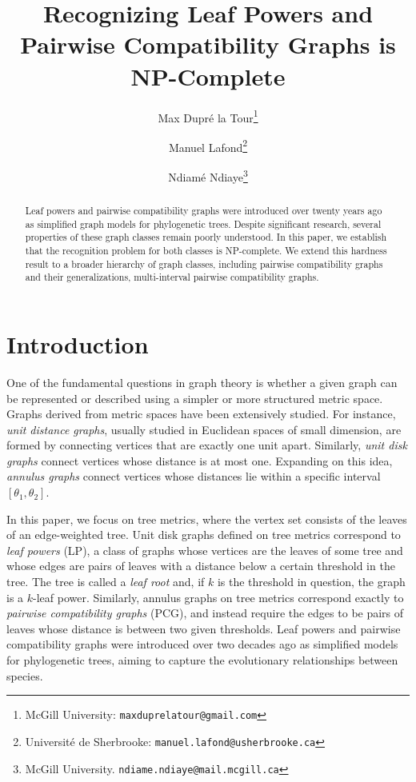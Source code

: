 \documentclass[11pt, letter]{article}
\title{Recognizing Leaf Powers and Pairwise Compatibility Graphs is NP-Complete}
\date{}
\author{Max Dupr\'e la Tour\thanks{McGill University: \texttt{maxduprelatour@gmail.com}} \and 
Manuel Lafond\thanks{Universit\'e de Sherbrooke: \texttt{manuel.lafond@usherbrooke.ca}} \and 
Ndiam\'e Ndiaye\thanks{McGill University. \texttt{ndiame.ndiaye@mail.mcgill.ca}} }
\newcommand{\ml}[1]{{\color{blue}{{#1}}}}
\theoremstyle{remark}
\begin{document}
\maketitle

\begin{abstract}
Leaf powers and pairwise compatibility graphs were introduced over twenty years ago as simplified graph models for phylogenetic trees. Despite significant research, several properties of these graph classes remain poorly understood. In this paper, we establish that the recognition problem for both classes is NP-complete. We extend this hardness result to a broader hierarchy of graph classes, including pairwise compatibility graphs and their generalizations, multi-interval pairwise compatibility graphs. 
\end{abstract}

\section{Introduction}

One of the fundamental questions in graph theory is whether a given graph can be represented or described using a simpler or more structured metric space. Graphs derived from metric spaces have been extensively studied. For instance, \emph{unit distance graphs}, usually studied in Euclidean spaces of small dimension, are formed by connecting vertices that are exactly one unit apart. Similarly, \emph{unit disk graphs} connect vertices whose distance is at most one. Expanding on this idea, \emph{annulus graphs} connect vertices whose distances lie within a specific interval $[\theta_1,\theta_2]$.

In this paper, we focus on tree metrics, where the vertex set consists of the leaves of an edge-weighted tree.
Unit disk graphs defined on tree metrics correspond to \emph{leaf powers} (LP), a class of graphs whose vertices are the leaves of some tree and whose edges are pairs of leaves with a distance below a certain threshold in the tree.
The tree is called a \emph{leaf root} and, if $k$ is the threshold in question, the graph is a $k$-leaf power.
Similarly, annulus graphs on tree metrics correspond exactly to \emph{pairwise compatibility graphs} (PCG), and instead require the edges to be pairs of leaves whose distance is between two given thresholds. Leaf powers and pairwise compatibility graphs were introduced over two decades ago \cite{NISHIMURA200269,Kearney2003} as simplified models for phylogenetic trees, aiming to capture the evolutionary relationships between species. 
\end{document}
